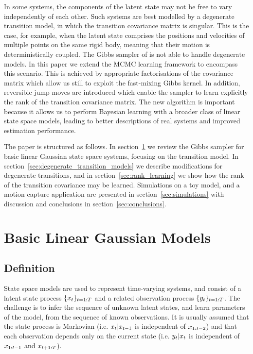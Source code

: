 \documentclass[journal,10pt]{IEEEtran}
\begin{document}
In some systems, the components of the latent state may not be free to vary independently of each other. Such systems are best modelled by a degenerate transition model, in which the transition covariance matrix is singular. This is the case, for example, when the latent state comprises the positions and velocities of multiple points on the same rigid body, meaning that their motion is deterministically coupled. The Gibbs sampler of \cite{Wills2012} is not able to handle degenerate models. In this paper we extend the MCMC learning framework to encompass this scenario. This is achieved by appropriate factorisations of the covariance matrix which allow us still to exploit the fast-mixing Gibbs kernel. In addition, reversible jump moves \cite{Green1995,Green2009} are introduced which enable the sampler to learn explicitly the rank of the transition covariance matrix. The new algorithm is important because it allows us to perform Bayesian learning with a broader class of linear state space models, leading to better descriptions of real systems and improved estimation performance.


The paper is structured as follows. In section~\ref{sec:linear_gaussian_models} we review the Gibbs sampler for basic linear Gaussian state space systems, focusing on the transition model. In section~\ref{sec:degenerate_transition_models} we describe modifications for degenerate transitions, and in section~\ref{sec:rank_learning} we show how the rank of the transition covariance may be learned. Simulations on a toy model, and a motion capture application are presented in section~\ref{sec:simulations} with discussion and conclusions in section~\ref{sec:conclusions}.





\section{Basic Linear Gaussian Models} \label{sec:linear_gaussian_models}

\subsection{Definition}
State space models are used to represent time-varying systems, and consist of a latent state process $\{x_{t}\}_{t=1:T}$ and a related observation process $\{y_{t}\}_{t=1:T}$. The challenge is to infer the sequence of unknown latent states, and learn parameters of the model, from the sequence of known observations. It is usually assumed that the state process is Markovian (i.e. $x_{t}|x_{t-1}$ is independent of $x_{1:t-2}$) and that each observation depends only on the current state (i.e. $y_{t}|x_{t}$ is independent of $x_{1:t-1}$ and $x_{t+1:T}$).
\end{document}
